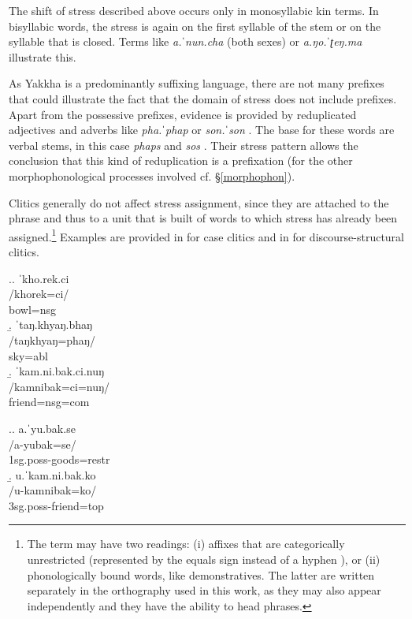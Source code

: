 The shift of stress described above occurs only in monosyllabic kin terms. In bisyllabic words, the stress is again on the first syllable  of the stem or on the syllable that is closed. Terms like \emph{a.ˈnun.cha}  (both sexes) or \emph{a.ŋo.ˈʈeŋ.ma}  illustrate this.


As Yakkha is a predominantly suffixing language, there are not many prefixes that could illustrate the fact that the domain of stress does not include prefixes. Apart from the possessive prefixes, evidence is provided by reduplicated adjectives and adverbs like \emph{pha.ˈphap}  or \emph{son.ˈson} . The base for these words are verbal stems, in this case \emph{phaps}  and \emph{sos} . Their stress pattern allows the conclusion that this kind of reduplication is a prefixation (for the other morphophonological processes involved cf. §\ref{morphophon}).


Clitics generally do not affect stress assignment, since they are attached to the phrase and thus to a unit that is built of words to which stress has already been assigned.\footnote{The term   may have two readings: (i) affixes that are categorically unrestricted (represented by the equals sign \rede{=} instead of a hyphen \rede{-}), or (ii) phonologically bound words, like demonstratives. The latter are written separately in the orthography used in this work, as they  may also appear independently and they have the ability to head phrases.} Examples are provided in \Next for case clitics and in \NNext for discourse-structural clitics.


\ex.\a. \glll ˈkho.rek.ci\\
/khorek=ci/\\
bowl{\sc =nsg}\\
\b. \glll ˈtaŋ.khyaŋ.bhaŋ\\
/taŋkhyaŋ=phaŋ/\\
sky{\sc =abl}\\
\b. \glll ˈkam.ni.bak.ci.nuŋ\\
/kamnibak=ci=nuŋ/\\
friend{\sc =nsg=com}\\


\ex.\a. \glll a.ˈyu.bak.se\\
/a-yubak=se/\\
{\sc 1sg.poss-}goods{\sc =restr}\\
\b. \glll u.ˈkam.ni.bak.ko\\
/u-kamnibak=ko/\\
{\sc 3sg.poss-}friend{\sc =top}\\


